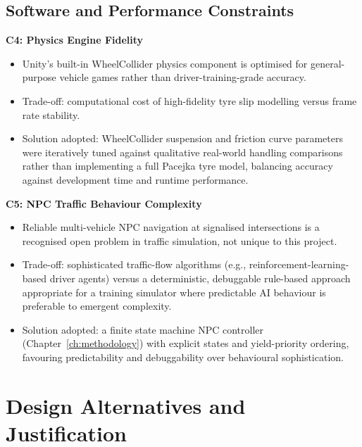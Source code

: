 \subsection{Software and Performance Constraints}
\textbf{C4: Physics Engine Fidelity}
\begin{itemize}
    \item Unity's built-in WheelCollider physics component is optimised for general-purpose vehicle games rather than driver-training-grade accuracy.
    \item Trade-off: computational cost of high-fidelity tyre slip modelling versus frame rate stability.
    \item Solution adopted: WheelCollider suspension and friction curve parameters were iteratively tuned against qualitative real-world handling comparisons rather than implementing a full Pacejka tyre model, balancing accuracy against development time and runtime performance.
\end{itemize}

\textbf{C5: NPC Traffic Behaviour Complexity}
\begin{itemize}
    \item Reliable multi-vehicle NPC navigation at signalised intersections is a recognised open problem in traffic simulation, not unique to this project.
    \item Trade-off: sophisticated traffic-flow algorithms (e.g., reinforcement-learning-based driver agents) versus a deterministic, debuggable rule-based approach appropriate for a training simulator where predictable AI behaviour is preferable to emergent complexity.
    \item Solution adopted: a finite state machine NPC controller (Chapter~\ref{ch:methodology}) with explicit states and yield-priority ordering, favouring predictability and debuggability over behavioural sophistication.
\end{itemize}

\section{Design Alternatives and Justification}

